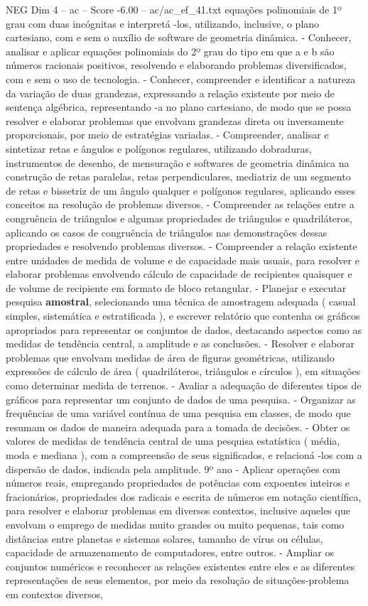 \begin{textsample}{NEG Dim 4 – ac – Score -6.00 – ac/ac\_ef\_41.txt}
equações polinomiais de 1º grau com duas incógnitas e interpretá -los, utilizando, inclusive, o plano cartesiano, com e sem o auxílio de software de geometria dinâmica. - Conhecer, analisar e aplicar equações polinomiais do 2º grau do tipo em que a e b são números racionais positivos, resolvendo e elaborando problemas diversificados, com e sem o uso de tecnologia. - Conhecer, compreender e identificar a natureza da variação de duas grandezas, expressando a relação existente por meio de sentença algébrica, representando -a no plano cartesiano, de modo que se possa resolver e elaborar problemas que envolvam grandezas direta ou inversamente proporcionais, por meio de estratégias variadas. - Compreender, analisar e sintetizar retas e ângulos e polígonos regulares, utilizando dobraduras, instrumentos de desenho, de mensuração e softwares de geometria dinâmica na construção de retas paralelas, retas perpendiculares, mediatriz de um segmento de retas e bissetriz de um ângulo qualquer e polígonos regulares, aplicando esses conceitos na resolução de problemas diversos. - Compreender as relações entre a congruência de triângulos e algumas propriedades de triângulos e quadriláteros, aplicando os casos de congruência de triângulos nas demonstrações dessas propriedades e resolvendo problemas diversos. - Compreender a relação existente entre unidades de medida de volume e de capacidade mais usuais, para resolver e elaborar problemas envolvendo cálculo de capacidade de recipientes quaisquer e de volume de recipiente em formato de bloco retangular. - Planejar e executar pesquisa \textbf{amostral}, selecionando uma técnica de amostragem adequada ( casual simples, sistemática e estratificada ), e escrever relatório que contenha os gráficos apropriados para representar os conjuntos de dados, destacando aspectos como as medidas de tendência central, a amplitude e as conclusões. - Resolver e elaborar problemas que envolvam medidas de área de figuras geométricas, utilizando expressões de cálculo de área ( quadriláteros, triângulos e círculos ), em situações como determinar medida de terrenos. - Avaliar a adequação de diferentes tipos de gráficos para representar um conjunto de dados de uma pesquisa. - Organizar as frequências de uma variável contínua de uma pesquisa em classes, de modo que resumam os dados de maneira adequada para a tomada de decisões. - Obter os valores de medidas de tendência central de uma pesquisa estatística ( média, moda e mediana ), com a compreensão de seus significados, e relacioná -los com a dispersão de dados, indicada pela amplitude. 9º ano - Aplicar operações com números reais, empregando propriedades de potências com expoentes inteiros e fracionários, propriedades dos radicais e escrita de números em notação científica, para resolver e elaborar problemas em diversos contextos, inclusive aqueles que envolvam o emprego de medidas muito grandes ou muito pequenas, tais como distâncias entre planetas e sistemas solares, tamanho de vírus ou células, capacidade de armazenamento de computadores, entre outros. - Ampliar os conjuntos numéricos e reconhecer as relações existentes entre eles e as diferentes representações de seus elementos, por meio da resolução de situações-problema em contextos diversos, 
\end{textsample}
